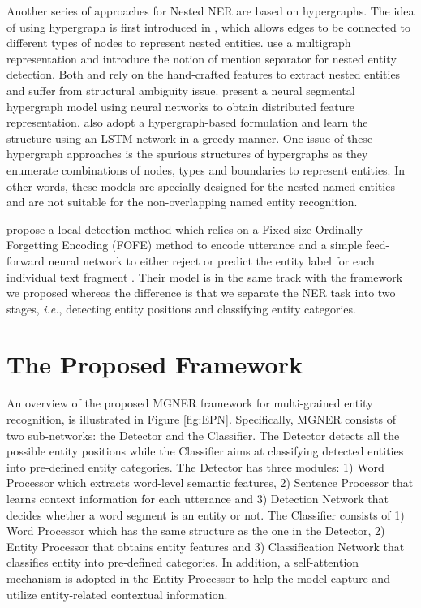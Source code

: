 \documentclass[11pt,a4paper]{article}
\newcommand{\ModelName}{\textsc{MGNER}}
\begin{document}
Another series of approaches for Nested NER are based on hypergraphs.
The idea of using hypergraph is first introduced in \citet{lu2015joint}, which allows edges to be connected to different types of nodes to represent nested entities.
\citet{lu2017mention} use a multigraph representation and introduce the notion of mention separator for nested entity detection.
Both \citet{lu2015joint} and \citet{lu2017mention} rely on the hand-crafted features to extract nested entities and suffer from structural ambiguity issue. \citet{wang2018neural} present a neural segmental hypergraph model using neural networks to obtain distributed feature representation.
\citet{katiyar2018nested} also adopt a hypergraph-based formulation and learn the structure using an LSTM network in a greedy manner. 
One issue of these hypergraph approaches is the spurious structures of hypergraphs as they enumerate combinations of nodes, types and boundaries to represent entities. In other words, these models are specially designed for the nested named entities and are not suitable for the non-overlapping named entity recognition.

\citet{xu2017local} propose a local detection method which relies on a Fixed-size Ordinally Forgetting Encoding (FOFE) method to encode utterance and a simple feed-forward neural network to either reject or predict the entity label for each individual text fragment \cite{luan2018multi, lee2017end, he2018jointly}. Their model is in the same track with the framework we proposed whereas the difference is that we separate the NER task into two stages, {\it i.e.}, detecting entity positions and classifying entity categories. \section{The Proposed Framework}
An overview of the proposed {\ModelName} framework for multi-grained entity recognition, is illustrated in Figure \ref{fig:EPN}.
Specifically, {\ModelName} consists of two sub-networks: the Detector and the Classifier. 
The Detector detects all the possible entity positions while the Classifier aims at classifying detected entities into pre-defined entity categories. 
The Detector has three modules: 1) Word Processor which extracts word-level semantic features, 2) Sentence Processor that learns context information for each utterance and 3) Detection Network that decides whether a word segment is an entity or not.
The Classifier consists of 1) Word Processor which has the same structure as the one in the Detector, 2) Entity Processor that obtains entity features and 3) Classification Network that classifies entity into pre-defined categories. 
In addition, a self-attention mechanism is adopted in the Entity Processor to help the model capture and utilize entity-related contextual information.
\end{document}
